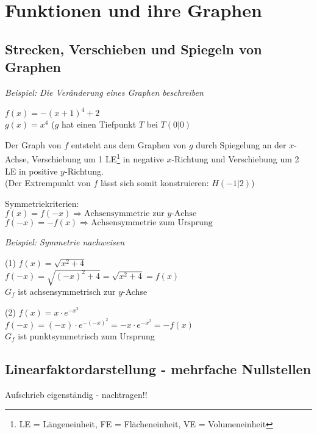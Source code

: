 \chapter{Funktionen und ihre Graphen}
\section{Strecken, Verschieben und Spiegeln von Graphen}
\textit{Beispiel: Die Veränderung eines Graphen beschreiben}

$f(x) = -(x + 1)^4 + 2$ \\
$g(x) = x^4$ ($g$ hat einen Tiefpunkt $T$ bei $T(0|0)$

Der Graph von $f$ entsteht aus dem Graphen von $g$ durch Spiegelung an der $x$-Achse, Verschiebung um 1 LE\footnote{LE = Längeneinheit, FE = Flächeneinheit, VE = Volumeneinheit} in negative $x$-Richtung und Verschiebung um 2 LE in positive $y$-Richtung.\\
(Der Extrempunkt von $f$ lässt sich somit konstruieren: $H(-1 | 2)$)

\begin{definition}
    Symmetriekriterien: \\
    $f(x) = f(-x) \Longrightarrow \text{Achsensymmetrie zur $y$-Achse}$ \\ 
   $ f(-x) = -f(x) \Longrightarrow \text{Achsensymmetrie zum Ursprung}$ 
\end{definition}

\textit{Beispiel: Symmetrie nachweisen}

\begin{minipage}{0.5\textwidth}
    (1) $f(x) = \sqrt{x^2 + 4}$ \\
    $f(-x) = \sqrt{(-x)^2 +4} = \sqrt{x^2 + 4} = f(x)$ \\ $G_f$ ist achsensymmetrisch zur $y$-Achse
\end{minipage}
\begin{minipage}{0.5\textwidth}
    (2) $f(x) = x \cdot e^{-x^2}$ \\
    $f(-x) = (-x) \cdot e^{-(-x)^2} = -x \cdot e^{-x^2} = -f(x)$ \\ $G_f$ ist punktsymmetrisch zum Ursprung
\end{minipage}

\section{Linearfaktordarstellung - mehrfache Nullstellen}

Aufschrieb eigenständig - nachtragen!!

